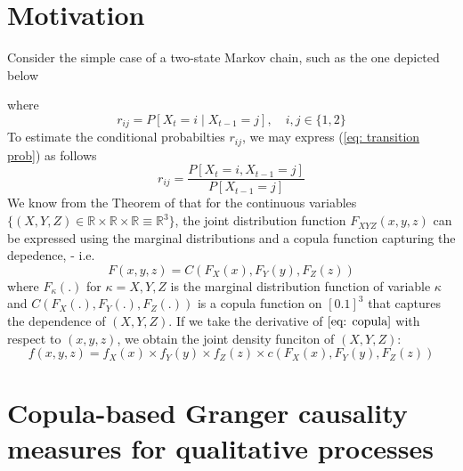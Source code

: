 \documentclass[harvard,11pt]{article}
\newcommand{\R}{\mathbb{R}}
\begin{document}
\section{Motivation \label{Motivation}}
Consider the simple case of a two-state Markov chain, such as the one depicted below

\begin{center}
\end{center}
where
\begin{equation}\label{eq: transition prob}
r_{ij}=P[X_t=i \mid X_{t-1}=j],\quad i,j\in\{1,2\}
\end{equation}
To estimate the conditional probabilties $r_{ij}$, we may express (\ref{eq: transition prob}) as follows
\begin{equation}
r_{ij}=\frac{P[X_t=i, X_{t-1}=j]}{P[X_{t-1}=j]}
\end{equation}
We know from the Theorem of \citet{sklar1959fonctions} that for the continuous variables $\{(X,Y,Z)\in\R\times\R\times\R\equiv \R^3\}$, the joint distribution function $F_{XYZ}(x,y,z)$ can be expressed using the marginal distributions and a copula function capturing the depedence, - i.e. 
\begin{equation}\label{eq: copula}
F(x,y,z)=C(F_X(x),F_Y(y),F_Z(z))
\end{equation}
where $F_{\kappa}(.)$ for $\kappa=X, Y, Z$ is the marginal distribution function of variable $\kappa$ and $C(F_X(.),F_Y(.),F_Z(.))$ is a copula function on $[0.1]^3$ that captures the dependence of $(X,Y,Z)$. If we take the derivative of $\ref{eq: copula}$ with respect to $(x,y,z)$, we obtain the joint density funciton of $(X,Y,Z)$:
\begin{equation}\label{eq: density}
f(x,y,z)=f_X(x)\times f_Y(y)\times f_Z(z)\times c(F_X(x),F_Y(y),F_Z(z))
\end{equation}
\section{Copula-based Granger causality measures for qualitative processes \label{Copula-based Granger causality measures for qualitative processes}}
\end{document}
